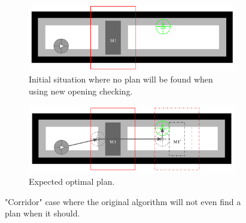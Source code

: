\begin{figure}[H]
\centering
\begin{subfigure}{.40\textwidth}
  \centering
  \includegraphics[width=\linewidth]{Figures/Check_New_Opening/corridor_original.png}
  \caption{Initial situation where no plan will be found when using new opening checking.}
  \label{fig:corridor_original}
\end{subfigure}\hspace*{\fill}
\begin{subfigure}{.40\textwidth}
  \centering
  \includegraphics[width=\linewidth]{Figures/Check_New_Opening/corridor_optimal_path.png}
  \caption{Expected optimal plan.}
  \label{fig:corridor_optimal_path}
\end{subfigure}
\caption{"Corridor" case where the original algorithm will not even find a plan when it should.}
\label{fig:corridor_case}
\end{figure}


